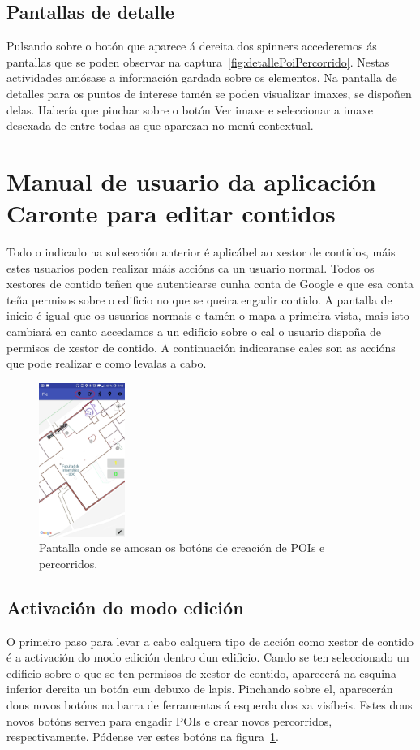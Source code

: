 \subsection{Pantallas de detalle}
Pulsando sobre o botón que aparece á dereita dos spinners accederemos ás pantallas que se poden observar na captura~\ref{fig:detallePoiPercorrido}. Nestas actividades amósase a información gardada sobre os elementos. Na pantalla de detalles para os puntos de interese tamén se poden visualizar imaxes, se dispoñen delas. Habería que pinchar sobre o botón Ver imaxe e seleccionar a imaxe desexada de entre todas as que aparezan no menú contextual.


\section{Manual de usuario da aplicación Caronte para editar contidos}
Todo o indicado na subsección anterior é aplicábel ao xestor de contidos, máis estes usuarios poden realizar máis accións ca un usuario normal. Todos os xestores de contido teñen que autenticarse cunha conta de Google e que esa conta teña permisos sobre o edificio no que se queira engadir contido. A pantalla de inicio é igual que os usuarios normais e tamén o mapa a primeira vista, mais isto cambiará en canto accedamos a un edificio sobre o cal o usuario dispoña de permisos de xestor de contido. A continuación indicaranse cales son as accións que pode realizar e como levalas a cabo.

\begin{figure}[h]
	\begin{center}
		\includegraphics[width=0.25\textwidth]{figures/android/mapaXestorEdicion}
		\caption{Pantalla onde se amosan os botóns de creación de POIs e percorridos.}
		\label{fig:mapaXestorEdicion}
	\end{center}
\end{figure}

\subsection{Activación do modo edición}
O primeiro paso para levar a cabo calquera tipo de acción como xestor de contido é a activación do modo edición dentro dun edificio. Cando se ten seleccionado un edificio sobre o que se ten permisos de xestor de contido, aparecerá na esquina inferior dereita un botón cun debuxo de lapis. Pinchando sobre el, aparecerán dous novos botóns na barra de ferramentas á esquerda dos xa visíbeis. Estes dous novos botóns serven para engadir POIs e crear novos percorridos, respectivamente. Pódense ver estes botóns na figura~\ref{fig:mapaXestorEdicion}.

